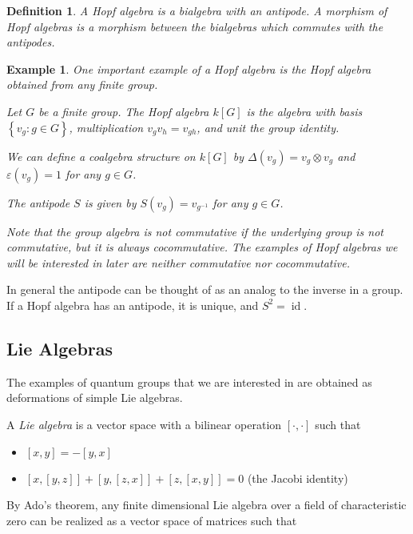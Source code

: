 \documentclass[]{article}
\newtheorem{defn}[theorem]{Definition}
\newtheorem{example}[theorem]{Example}
\newcommand{\id}{\operatorname{id}}
\numberwithin{equation}{subsection}
\begin{document}
\begin{defn}
    A \emph{Hopf algebra} is a bialgebra with an antipode. A morphism of Hopf
    algebras is a morphism between the bialgebras which commutes with the
    antipodes. 
\end{defn}

\begin{example}
    \label{groupalgebra}
    One important example of a Hopf algebra is the Hopf algebra obtained from
    any finite group. 

    Let $G$ be a finite group. The Hopf algebra $k[G]$ is the algebra with
    basis $\left\{ v_g: g \in G \right\}$, multiplication $v_g v_h = v_{gh}$,
    and unit the group identity. 

    We can define a coalgebra structure on $k[G]$ by $\Delta(v_g) = v_g \otimes v_g$
    and $\varepsilon(v_g) = 1$ for any $g \in G$.

    The antipode $S$ is given by $S(v_g) = v_{g^{-1}}$ for any $g \in G$.

    Note that the group algebra is not commutative if the underlying group is
    not commutative, but it is always cocommutative. The examples of Hopf
    algebras we will be interested in later are neither commutative nor
    cocommutative. 
\end{example}

In general the antipode can be thought of as an analog to the inverse in a
group. If a Hopf algebra has an antipode, it is unique, and $S^2 = \id$.

\subsection{Lie Algebras}

The examples of quantum groups that we are interested in are obtained as deformations of simple Lie algebras. 

A \emph{Lie algebra} is a vector space with a bilinear operation $\left[ \cdot, \cdot \right]$ such that 

\begin{itemize}
    \item $\left[ x,y \right] = -\left[ y,x \right]$
    \item $\left[ x, \left[ y,z \right] \right] + \left[ y, \left[ z,x \right] \right] + \left[ z, \left[ x,y \right] \right] = 0$ (the Jacobi identity)
\end{itemize}

By Ado's theorem, any finite dimensional Lie algebra over a field of characteristic zero can be realized as a vector space of matrices such that 
\end{document}
